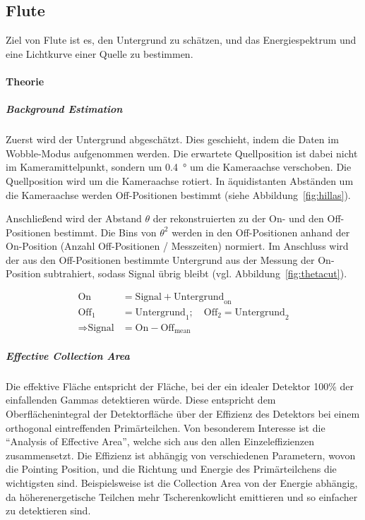 \subsection{Flute}%
\label{sub:flute}

Ziel von Flute ist es,
den Untergrund zu schätzen,
und das Energiespektrum und
eine Lichtkurve einer Quelle zu bestimmen.

\paragraph{Theorie}%

\subparagraph{Background Estimation}
Zuerst wird der Untergrund abgeschätzt.
Dies geschieht, indem die Daten im Wobble-Modus aufgenommen werden.
Die erwartete Quellposition ist dabei nicht im
Kameramittelpunkt,
sondern um
\SI{0.4}{\degree} um die Kameraachse
verschoben.
Die Quellposition wird um die Kameraachse rotiert.
In äquidistanten Abständen um die Kameraachse werden Off-Positionen bestimmt
(siehe Abbildung~\ref{fig:hillas}).

Anschließend wird der Abstand $\theta$ der rekonstruierten
zu der On- und den Off-Positionen bestimmt.
Die Bins von $\theta^2$ werden in den Off-Positionen
anhand der On-Position (Anzahl Off-Positionen / Messzeiten) normiert.
Im Anschluss wird der aus den Off-Positionen bestimmte Untergrund
aus der Messung der On-Position subtrahiert, sodass Signal übrig bleibt
(vgl. Abbildung~\ref{fig:thetacut}).


\begin{align*}
    \text{On} &= \text{Signal} + \text{Untergrund}_{\text{on}} \\
    \text{Off}_{1} &= \text{Untergrund}_{1} ;
    \quad \text{Off}_{2} = \text{Untergrund}_{2} \\
    \Rightarrow \text{Signal} &= \text{On} - \text{Off}_{\text{mean}}
\end{align*}

\subparagraph{Effective Collection Area}
Die effektive Fläche entspricht der Fläche,
bei der ein idealer Detektor 100\%
der einfallenden Gammas detektieren würde.
Diese entspricht dem Oberflächenintegral der Detektorfläche
über der Effizienz des Detektors
bei einem orthogonal eintreffenden Primärteilchen.
Von besonderem Interesse ist die \enquote{Analysis of Effective Area},
welche sich aus den allen Einzeleffizienzen zusammensetzt.
Die Effizienz ist abhängig von verschiedenen Parametern,
wovon die Pointing Position,
und die Richtung und Energie des Primärteilchens
die wichtigsten sind.
Beispielsweise ist die Collection Area von der Energie abhängig,
da höherenergetische Teilchen mehr Tscherenkowlicht emittieren
und so einfacher zu detektieren sind.

